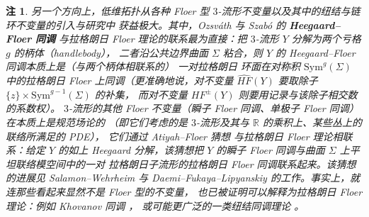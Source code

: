 \documentclass[UTF8,a4paper,11pt,fontset=windows]{ctexart}
\theoremstyle{cnthm}
\newtheorem{rem}[thm]{注}
\numberwithin{equation}{section}
\newcommand{\R}{\mathbb{R}}
\newcommand{\HF}{HF}                  %
\begin{document}

\begin{rem}\label{rem:1.6}
另一个方向上，低维拓扑从各种 Floer 型 $3$-流形不变量以及其中的纽结与链环不变量的引入与研究中
获益极大。其中，Ozsváth 与 Szabó 的 \textbf{Heegaard--Floer 同调} \cite{r81} 与拉格朗日
Floer 理论的联系最为直接：把 $3$-流形 $Y$ 分解为两个亏格 $g$ 的柄体（handlebody），
二者沿公共边界曲面 $\Sigma$ 粘合，则 $Y$ 的 Heegaard--Floer 同调本质上是（与两个柄体相联系的）
一对拉格朗日
环面在对称积 $\mathrm{Sym}^{g}(\Sigma)$ 中的拉格朗日 Floer 上同调（更准确地说，对不变量
$\widehat{HF}(Y)$ 要取除子 $\{z\}\times\mathrm{Sym}^{g-1}(\Sigma)$ 的补集，
而对不变量 $\HF^{\pm}(Y)$ 则要用记录与该除子相交数的系数权）。
$3$-流形的其他 Floer 不变量（瞬子 Floer 同调、单极子 Floer 同调）在本质上是规范场论的
（即它们考虑的是 $3$-流形及其与 $\R$ 的乘积上、某些丛上的联络所满足的 PDE），
它们通过 Atiyah--Floer 猜想 \cite{r17} 与拉格朗日 Floer 理论相联系：给定 $Y$ 的如上
Heegaard 分解，该猜想把 $Y$ 的瞬子 Floer 同调与曲面 $\Sigma$ 上平坦联络模空间中的一对
拉格朗日子流形的拉格朗日 Floer 同调联系起来。该猜想的进展见 Salamon--Wehrheim \cite{r90}
与 Daemi--Fukaya--Lipyanskiy \cite{r36} 的工作。事实上，就连那些看起来显然不是 Floer 型的不变量，
也已被证明可以解释为拉格朗日 Floer 理论：例如 Khovanov 同调 \cite{r13}，
或可能更广泛的一类纽结同调理论 \cite{r15}。
\end{rem}


\end{document}
